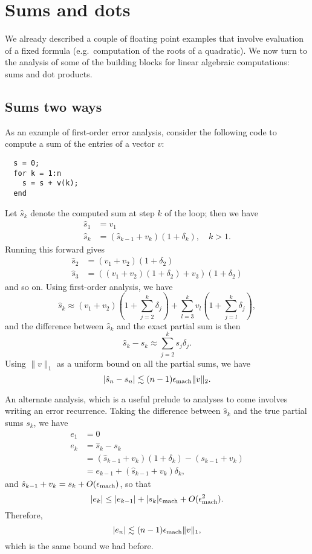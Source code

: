 \documentclass[12pt, leqno]{article} %
\begin{document}


\section{Sums and dots}

We already described a couple of floating point examples that
involve evaluation of a fixed formula (e.g.~computation of
the roots of a quadratic).  We now turn to the analysis of
some of the building blocks for linear algebraic computations:
sums and dot products.

\subsection{Sums two ways}

As an example of first-order error analysis, consider the following
code to compute a sum of the entries of a vector $v$:
\begin{lstlisting}
  s = 0;
  for k = 1:n
    s = s + v(k);
  end
\end{lstlisting}
Let $\hat{s}_k$ denote the computed sum at step $k$ of the loop;
then we have
\begin{align*}
  \hat{s}_1 &= v_1 \\
  \hat{s}_k &= (\hat{s}_{k-1} + v_k)(1 + \delta_k), \quad k > 1.
\end{align*}
Running this forward gives
\begin{align*}
  \hat{s}_2 &= (v_1 + v_2)(1+\delta_2) \\
  \hat{s}_3 &= ((v_1 + v_2)(1+\delta_2) + v_3)(1+\delta_2)
\end{align*}
and so on.  Using first-order analysis, we have
\[
  \hat{s}_k \approx (v_1 + v_2)\left(1 + \sum_{j=2}^k \delta_j \right)
              + \sum_{l=3}^k v_l \left( 1 + \sum_{j=l}^k \delta_j \right),
\]
and the difference between $\hat{s}_k$ and the exact partial sum
is then
\[
  \hat{s}_k-s_k \approx \sum_{j=2}^k s_j \delta_j.
\]
Using $\|v\|_1$ as a uniform bound on all the partial sums, we have
\[
  |\hat{s}_n-s_n| \lesssim (n-1) \epsilon_{\mathrm{mach}} \|v\|_2.
\]

An alternate analysis, which is a useful prelude to analyses to come
involves writing an error recurrence.
Taking the difference between $\hat{s}_k$ and the true partial sums $s_k$,
we have
\begin{align*}
  e_1 &= 0 \\
  e_{k} &= \hat{s}_k-s_k \\
        &= (\hat{s}_{k-1} + v_k)(1+\delta_k) - (s_{k-1} + v_k) \\
        &= e_{k-1} + (\hat{s}_{k-1} + v_k) \delta_k,
\end{align*}
and $\hat{s}_{k-1} + v_k = s_k + O(\epsilon_{\mathrm{mach}})$, so that
\[
  |e_{k}| \leq |e_{k-1}| + |s_k| \epsilon_{\mathrm{mach}} + O(\epsilon_{\mathrm{mach}}^2).
\]
Therefore,
\[
  |e_{n}| \lesssim (n-1) \epsilon_{\mathrm{mach}} \|v\|_1,
\]
which is the same bound we had before.
\end{document}
